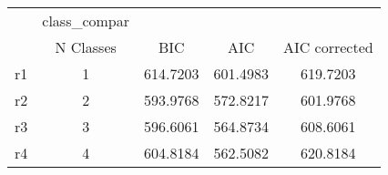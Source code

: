 \begin{tabular}{l*{4}{c}}
\hline\hline
            &class\_compar&            &            &            \\
            &   N Classes&         BIC&         AIC&AIC corrected\\
\hline
r1          &           1&    614.7203&    601.4983&    619.7203\\
r2          &           2&    593.9768&    572.8217&    601.9768\\
r3          &           3&    596.6061&    564.8734&    608.6061\\
r4          &           4&    604.8184&    562.5082&    620.8184\\
\hline\hline
\end{tabular}
